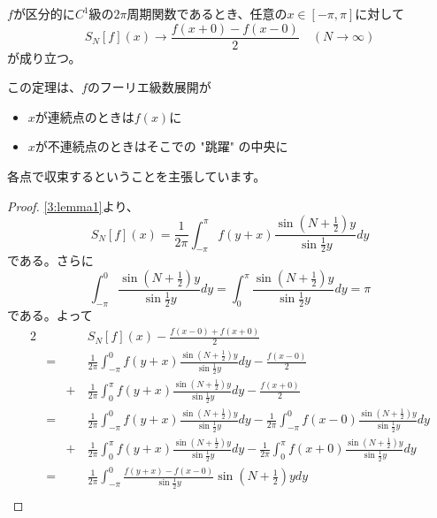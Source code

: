 \documentclass[report]{jlreq}
\begin{document}
\begin{theorem}
    $f$が区分的に$C^1$級の$2\pi$周期関数であるとき、任意の$x \in [-\pi, \pi]$に対して
    \begin{equation}
        S_N[f](x) \to \frac{f(x+0) - f(x-0)}{2} \quad (N \to \infty)
    \end{equation}
    が成り立つ。
\end{theorem}

この定理は、$f$のフーリエ級数展開が
\begin{itemize}
    \item $x$が連続点のときは$f(x)$に
    \item $x$が不連続点のときはそこでの "跳躍" の中央に
\end{itemize}
各点で収束するということを主張しています。

\begin{proof}
    \cref{3:lemma1}より、
    \begin{equation}
        S_N[f](x) = \frac{1}{2\pi}
            \int_{-\pi}^{\pi} f(y+x)\frac{\sin\left(N+\frac{1}{2}\right)y}{\sin\frac{1}{2}y} dy
    \end{equation}
    である。さらに
    \begin{equation}
        \int_{-\pi}^{0} \frac{\sin\left(N+\frac{1}{2}\right)y}{\sin\frac{1}{2}y} dy
        = \int_{0}^{\pi} \frac{\sin\left(N+\frac{1}{2}\right)y}{\sin\frac{1}{2}y} dy
        = \pi
    \end{equation}
    である。よって
    \begin{alignat}{2}
        &&&S_N[f](x) - \frac{f(x-0) + f(x+0)}{2} \\
        &=&&\frac{1}{2\pi} \int_{-\pi}^0 f(y+x) \frac{\sin\left(N+\frac{1}{2}\right)y}{\sin\frac{1}{2}y} dy
            -\frac{f(x-0)}{2} \nonumber \\
        &&+\,&\frac{1}{2\pi} \int_0^\pi f(y+x) \frac{\sin\left(N+\frac{1}{2}\right)y}{\sin\frac{1}{2}y} dy
            -\frac{f(x+0)}{2} \\
        &=&&\frac{1}{2\pi} \int_{-\pi}^0 f(y+x) \frac{\sin\left(N+\frac{1}{2}\right)y}{\sin\frac{1}{2}y} dy
            -\frac{1}{2\pi} \int_{-\pi}^0 f(x-0) \frac{\sin\left(N+\frac{1}{2}\right)y}{\sin\frac{1}{2}y} dy \nonumber \\
        &&+\,&\frac{1}{2\pi} \int_0^\pi f(y+x) \frac{\sin\left(N+\frac{1}{2}\right)y}{\sin\frac{1}{2}y} dy
            -\frac{1}{2\pi} \int_0^\pi f(x+0) \frac{\sin\left(N+\frac{1}{2}\right)y}{\sin\frac{1}{2}y} dy \\
        &=&&\frac{1}{2\pi}
            \int_{-\pi}^0 \frac{f(y+x) - f(x-0)}{\sin\frac{1}{2}y} \sin\left(N+\frac{1}{2}\right)y dy \nonumber \\

\end{alignat}
\end{proof}
\end{document}

